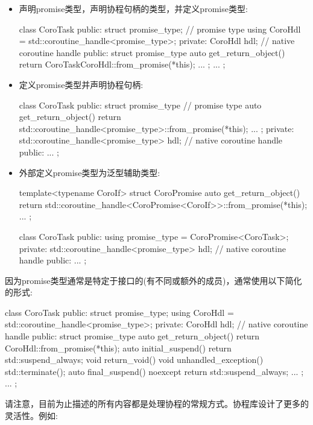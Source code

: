 \begin{itemize}
\item
声明promise类型，声明协程句柄的类型，并定义promise类型:

\begin{cpp}
class CoroTask {
public:
	struct promise_type; // promise type
	using CoroHdl = std::coroutine_handle<promise_type>;
private:
	CoroHdl hdl; // native coroutine handle
public:
	struct promise_type {
		auto get_return_object() {
			return CoroTask{CoroHdl::from_promise(*this)};
		}
		...
	};
	...
};
\end{cpp}

\item
定义promise类型并声明协程句柄:

\begin{cpp}
class CoroTask {
public:
	struct promise_type { // promise type
		auto get_return_object() {
			return std::coroutine_handle<promise_type>::from_promise(*this);
		}
		...
	};
private:
	std::coroutine_handle<promise_type> hdl; // native coroutine handle
	public:
	...
};
\end{cpp}

\item
外部定义promise类型为泛型辅助类型:

\begin{cpp}
template<typename CoroIf>
struct CoroPromise {
	auto get_return_object() {
		return std::coroutine_handle<CoroPromise<CoroIf>>::from_promise(*this);
	}
	...
};

class CoroTask {
	public:
	using promise_type = CoroPromise<CoroTask>;
	private:
	std::coroutine_handle<promise_type> hdl; // native coroutine handle
	public:
	...
};
\end{cpp}
\end{itemize}

因为promise类型通常是特定于接口的(有不同或额外的成员)，通常使用以下简化的形式:

\begin{cpp}
class CoroTask {
public:
	struct promise_type;
	using CoroHdl = std::coroutine_handle<promise_type>;
private:
	CoroHdl hdl; // native coroutine handle
public:
	struct promise_type {
		auto get_return_object() { return CoroHdl::from_promise(*this); }
		auto initial_suspend() { return std::suspend_always{}; }
		void return_void() { }
		void unhandled_exception() { std::terminate(); }
		auto final_suspend() noexcept { return std::suspend_always{}; }
		...
	};
	...
};
\end{cpp}

请注意，目前为止描述的所有内容都是处理协程的常规方式。协程库设计了更多的灵活性。例如:

